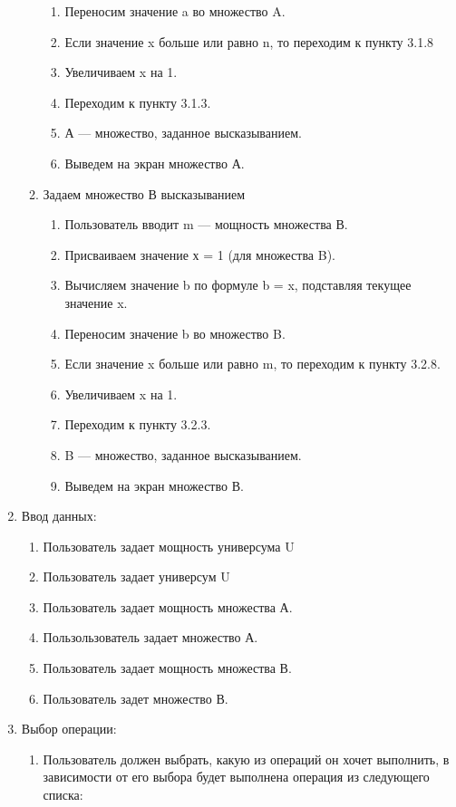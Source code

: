 \documentclass[a4paper,12pt]{extarticle}
\begin{document}
\begin{enumerate}
\begin{enumerate}[label*=\arabic*.]
\begin{enumerate}[label*=\arabic*.]
      \item Переносим значение a во множество A.
      \item Если значение x больше или равно n, то переходим к пункту 3.1.8
      \item Увеличиваем x на 1.
      \item Переходим к пункту 3.1.3.
      \item А — множество, заданное высказыванием.
      \item Выведем на экран множество А.
    \end{enumerate}
    \item Задаем множество В высказыванием
    \begin{enumerate}[label*=\arabic*.]
      \item Пользователь вводит m — мощность множества В.
      \item Присваиваем значение х = 1 (для множества B).
      \item Вычисляем значение b по формуле b = x, подставляя текущее значение x.
      \item Переносим значение b во множество B.
      \item Если значение x больше или равно m, то переходим к пункту 3.2.8.
      \item Увеличиваем x на 1.
      \item Переходим к пункту 3.2.3.
      \item B — множество, заданное высказыванием.
      \item Выведем на экран множество В.
    \end{enumerate}
  \end{enumerate}
  \newpage
  \item Ввод данных:
  \begin{enumerate}[label*=\arabic*.]
    \item Пользователь задает мощность универсума U
    \item Пользователь задает универсум U
    \item Пользователь задает мощность множества А.
    \item Пользользователь задает множество А.
    \item Пользователь задает мощность множества В.
    \item Пользователь задет множество В.
  \end{enumerate}
  \item Выбор операции:
  \begin{enumerate}[label*=\arabic*.]
    \item Пользователь должен выбрать, какую из операций он хочет выполнить, в зависимости от его выбора будет выполнена операция из следующего списка:

\end{enumerate}
\end{enumerate}
\end{document}
